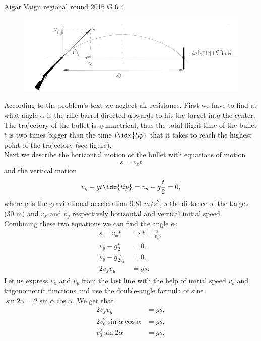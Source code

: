 \documentclass[11pt]{article}
\begin{document}
{Aigar Vaigu} %
{regional round} %
{2016} %
{G 6} %
{4} %
{

\ifEngSolution
\begin{figure}[h!]
	\centering
	\includegraphics[scale=0.55]{2016-v2g-06-Lasketiir-1.PNG}
\end{figure}
According to the problem’s text we neglect air resistance. First we have to find at what angle $\alpha$ is the rifle barrel directed upwards to hit the target into the center. The trajectory of the bullet is symmetrical, thus the total flight time of the bullet $t$ is two times bigger than the time $t\idx{tip}$ that it takes to reach the highest point of the trajectory (see figure).\\
Next we describe the horizontal motion of the bullet with equations of motion
$$
s=v_{x}t
$$ 
and the vertical motion
$$
v_{y}-gt\idx{tip}=v_{y}-g\frac{t}{2}=0,
$$ 
where $g$ is the gravitational acceleration $\SI{9,81}{m/s^2}$, $s$ the distance of the target (30 m) and $v_x$ and $v_y$ respectively horizontal and vertical initial speed.\\
Combining these two equations we can find the angle $\alpha$:
\begin{align*}
s=v_{x}t & \Rightarrow t=\frac{s}{v_{x}},\\
v_{y}-g\frac{t}{2} & = 0,\\
v_{y}-g\frac{s}{2v_{x}} & = 0,\\
2v_{x}v_{y} & = gs.
\end{align*}
Let us express $v_x$ and $v_y$ from the last line with the help of initial speed $v_o$ and trigonometric functions and use the double-angle formula of sine $\sin2\alpha = 2\sin\alpha\cos\alpha$. We get that
\begin{align*}
2v_{x}v_{y} & = gs,\\
2v_{0}^{2}\sin\alpha\cos\alpha & = gs,\\
v_{0}^{2}\sin2\alpha & = gs,\\

\end{align*}}
\end{document}
